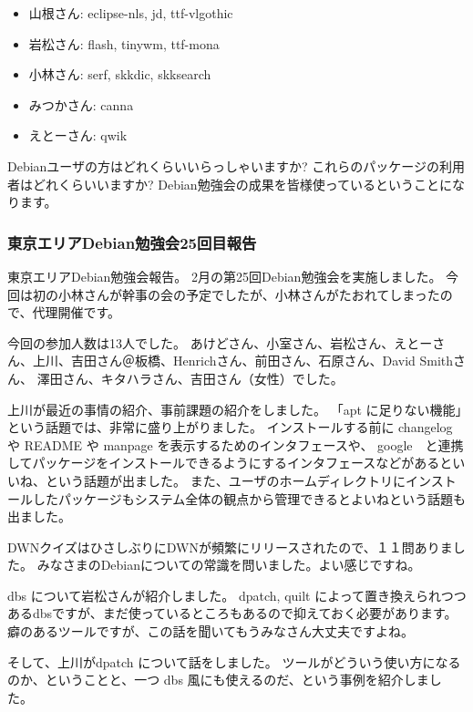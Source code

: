 \documentclass[mingoth,a4paper]{jsarticle}
\begin{document}
\begin{itemize}
 \item 山根さん: eclipse-nls, jd, ttf-vlgothic
 \item 岩松さん: flash, tinywm, ttf-mona
 \item 小林さん: serf, skkdic, skksearch
 \item みつかさん: canna
 \item えとーさん: qwik
\end{itemize}

Debianユーザの方はどれくらいいらっしゃいますか?
これらのパッケージの利用者はどれくらいいますか?
Debian勉強会の成果を皆様使っているということになります。

\subsubsection{東京エリアDebian勉強会25回目報告}

   	  東京エリアDebian勉強会報告。
	  2月の第25回Debian勉強会を実施しました。
	    今回は初の小林さんが幹事の会の予定でしたが、小林さんがたおれてしまったので、代理開催です。
	  
	  今回の参加人数は13人でした。
	  あけどさん、小室さん、岩松さん、えとーさん、上川、吉田さん＠板橋、Henrichさん、前田さん、石原さん、David Smithさん、
	  澤田さん、キタハラさん、吉田さん（女性）でした。
        
	
	  
	    上川が最近の事情の紹介、事前課題の紹介をしました。
	    「apt に足りない機能」という話題では、非常に盛り上がりました。
	    インストールする前に changelog や README や manpage を表示するためのインタフェースや、
	    google　と連携してパッケージをインストールできるようにするインタフェースなどがあるといいね、という話題が出ました。
	    また、ユーザのホームディレクトリにインストールしたパッケージもシステム全体の観点から管理できるとよいねという話題も出ました。
	  
	  
	    DWNクイズはひさしぶりにDWNが頻繁にリリースされたので、１１問ありました。
	    みなさまのDebianについての常識を問いました。よい感じですね。
	  
	  
	    dbs について岩松さんが紹介しました。
	    dpatch, quilt によって置き換えられつつあるdbsですが、まだ使っているところもあるので抑えておく必要があります。
	    癖のあるツールですが、この話を聞いてもうみなさん大丈夫ですよね。
	  
	  
	    そして、上川がdpatch について話をしました。
	    ツールがどういう使い方になるのか、ということと、一つ dbs 風にも使えるのだ、という事例を紹介しました。
	  
\end{document}
